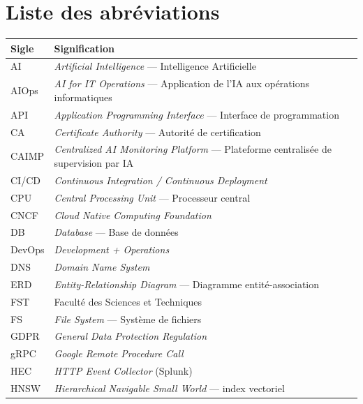\chapter*{Liste des abréviations}

\begin{longtable}{@{}lp{11cm}@{}}
\toprule
\textbf{Sigle} & \textbf{Signification} \\
\midrule
\endhead
\bottomrule
\endfoot

AI    & \textit{Artificial Intelligence} — Intelligence Artificielle \\
AIOps & \textit{AI for IT Operations} — Application de l'IA aux opérations informatiques \\
API   & \textit{Application Programming Interface} — Interface de programmation \\
CA    & \textit{Certificate Authority} — Autorité de certification \\
CAIMP & \textit{Centralized AI Monitoring Platform} — Plateforme centralisée de supervision par IA \\
CI/CD & \textit{Continuous Integration / Continuous Deployment} \\
CPU   & \textit{Central Processing Unit} — Processeur central \\
CNCF  & \textit{Cloud Native Computing Foundation} \\
DB    & \textit{Database} — Base de données \\
DevOps & \textit{Development + Operations} \\
DNS   & \textit{Domain Name System} \\
ERD   & \textit{Entity-Relationship Diagram} — Diagramme entité-association \\
FST   & Faculté des Sciences et Techniques \\
FS    & \textit{File System} — Système de fichiers \\
GDPR  & \textit{General Data Protection Regulation} \\
gRPC  & \textit{Google Remote Procedure Call} \\
HEC   & \textit{HTTP Event Collector} (Splunk) \\
HNSW  & \textit{Hierarchical Navigable Small World} — index vectoriel \\

\end{longtable}
